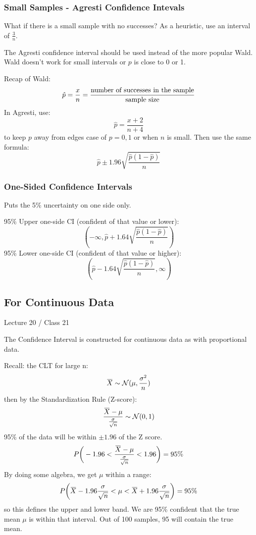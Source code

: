 \documentclass[11pt, oneside]{article}   	%
\newcommand{\overbar}[1]{\mkern 1.5mu\overline{\mkern-1.5mu#1\mkern-1.5mu}\mkern 1.5mu}
\begin{document}
\subsubsection{Small Samples - Agresti Confidence Intevals}

What if there is a small sample with no successes? As a heuristic, use an interval of $\frac{3}{n}$.

The Agresti confidence interval should be used instead of the more popular Wald. Wald doesn't work for small intervals or $p$ is close to 0 or 1.

Recap of Wald:\\
\[
\hat{p} = \frac{x}{n} = \frac{\text{number of successes in the sample}}{\text{sample size}}\\
\]
In Agresti, use:
\[
\hat{p} = \frac{x+2} {n+4}
\]
to keep $p$ away from edges case of $p = 0, 1$ or when $n$ is small.
Then use the same formula:
\[
\hat{p} \pm 1.96 \sqrt{\frac{\hat{p}(1-\hat{p}) } {n} }
\]

\subsubsection{One-Sided Confidence Intervals}

Puts the 5\% uncertainty on one side only.

95\% Upper one-side CI (confident of that value or lower):
\[
(-\infty, \hat{p} + 1.64 \sqrt{\frac{\hat{p}(1-\hat{p}) } {n} } )
\]
95\% Lower one-side CI (confident of that value or higher):
\[
(\hat{p} - 1.64 \sqrt{\frac{\hat{p}(1-\hat{p}) } {n} } , \infty)
\]

\subsection{For Continuous Data}

Lecture 20 / Class 21

The Confidence Interval is constructed for continuous data as with proportional data.

Recall: the CLT for large n:
\[
\overbar{X} \sim \mathcal{N}(\mu, \frac{\sigma^2}{n})
\]
then by the Standardization Rule (Z-score):
\[
\frac{ \overbar{X} - \mu} {\frac{\sigma} {\sqrt{n}} } \sim \mathcal{N}(0,1)
\]
95\% of the data will be within $\pm1.96$ of the Z score.
\[
P\bigg(-1.96 < \frac{ \overbar{X} - \mu} {\frac{\sigma} {\sqrt{n}} } < 1.96\bigg) = 95\%
\]
By doing some algebra, we get $\mu$ within a range:
\[
P\bigg(\overbar{X} - 1.96 \frac{\sigma} {\sqrt{n}} < \mu < \overbar{X} + 1.96 \frac{\sigma} {\sqrt{n}}\bigg) = 95\%
\]
so this defines the upper and lower band. We are 95\% confident that the true mean $\mu$ is within that interval. Out of 100 samples, 95 will contain the true mean.
\end{document}
